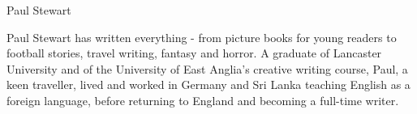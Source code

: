 {\Large Paul Stewart}

\begin{figure}
	\vspace{-10mm}
	\vspace{-10mm}
\end{figure}

Paul Stewart has written everything - from picture books for young readers to football stories, travel writing, fantasy and horror. A graduate of Lancaster University and of the University of East Anglia's creative writing course, Paul, a keen traveller, lived and worked in Germany and Sri Lanka teaching English as a foreign language, before returning to England and becoming a full-time writer. 